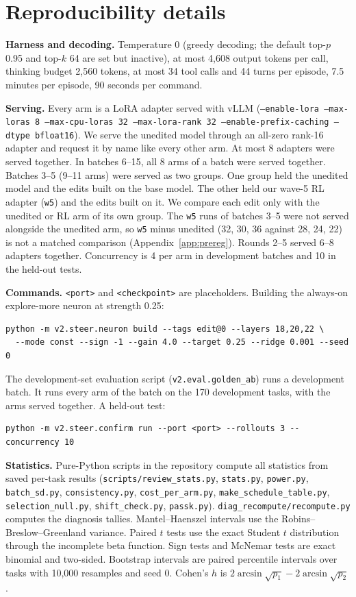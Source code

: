 \section{Reproducibility details}
\label{app:repro}
\textbf{Harness and decoding.} Temperature 0 (greedy decoding; the default top-$p$ 0.95 and top-$k$ 64 are set but inactive), at most 4,608 output tokens per call, thinking budget 2,560 tokens, at most 34 tool calls and 44 turns per episode, 7.5 minutes per episode, 90 seconds per command.

\textbf{Serving.} Every arm is a LoRA adapter served with vLLM (\texttt{--enable-lora --max-loras 8 --max-cpu-loras 32 --max-lora-rank 32 --enable-prefix-caching --dtype bfloat16}). We serve the unedited model through an all-zero rank-16 adapter and request it by name like every other arm. At most 8 adapters were served together. In batches 6--15, all 8 arms of a batch were served together. Batches 3--5 (9--11 arms) were served as two groups. One group held the unedited model and the edits built on the base model. The other held our wave-5 RL adapter (\texttt{w5}) and the edits built on it. We compare each edit only with the unedited or RL arm of its own group. The \texttt{w5} runs of batches 3--5 were not served alongside the unedited arm, so \texttt{w5} minus unedited (32, 30, 36 against 28, 24, 22) is not a matched comparison (Appendix~\ref{app:prereg}). Rounds 2--5 served 6--8 adapters together. Concurrency is 4 per arm in development batches and 10 in the held-out tests.

\textbf{Commands.} \texttt{<port>} and \texttt{<checkpoint>} are placeholders. Building the always-on explore-more neuron at strength 0.25:
{\small\begin{verbatim}
python -m v2.steer.neuron build --tags edit@0 --layers 18,20,22 \
  --mode const --sign -1 --gain 4.0 --target 0.25 --ridge 0.001 --seed 0
\end{verbatim}}
The development-set evaluation script (\texttt{v2.eval.golden\_ab}) runs a development batch. It runs every arm of the batch on the 170 development tasks, with the arms served together. A held-out test:
{\small\begin{verbatim}
python -m v2.steer.confirm run --port <port> --rollouts 3 --concurrency 10
\end{verbatim}}

\textbf{Statistics.} Pure-Python scripts in the repository compute all statistics from saved per-task results (\texttt{scripts/review\_stats.py}, \texttt{stats.py}, \texttt{power.py}, \texttt{batch\_sd.py}, \texttt{consistency.py}, \texttt{cost\_per\_arm.py}, \texttt{make\_schedule\_table.py}, \texttt{selection\_null.py}, \texttt{shift\_check.py}, \texttt{passk.py}). \texttt{diag\_recompute/recompute.py} computes the diagnosis tallies. Mantel--Haenszel intervals use the Robins--Breslow--Greenland variance. Paired $t$ tests use the exact Student $t$ distribution through the incomplete beta function. Sign tests and McNemar tests are exact binomial and two-sided. Bootstrap intervals are paired percentile intervals over tasks with 10,000 resamples and seed 0. Cohen's $h$ is $2\arcsin\sqrt{p_1} - 2\arcsin\sqrt{p_2}$.

